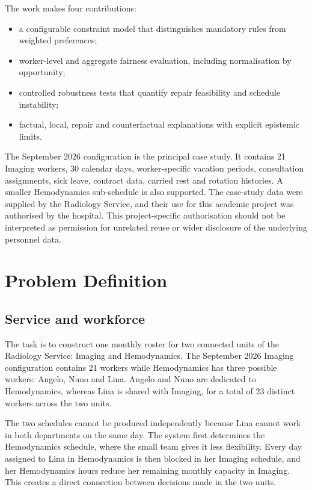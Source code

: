 \documentclass[11pt,a4paper]{article}
\begin{document}
The work makes four contributions:

\begin{itemize}
  \item a configurable constraint model that distinguishes mandatory rules from weighted preferences;
  \item worker-level and aggregate fairness evaluation, including normalisation by opportunity;
  \item controlled robustness tests that quantify repair feasibility and schedule instability;
  \item factual, local, repair and counterfactual explanations with explicit epistemic limits.
\end{itemize}

The September 2026 configuration is the principal case study. It contains 21 Imaging workers, 30 calendar days, worker-specific vacation periods, consultation assignments, sick leave, contract data, carried rest and rotation histories. A smaller Hemodynamics sub-schedule is also supported. The case-study data were supplied by the Radiology Service, and their use for this academic project was authorised by the hospital. This project-specific authorisation should not be interpreted as permission for unrelated reuse or wider disclosure of the underlying personnel data.

\section{Problem Definition}

\subsection{Service and workforce}

The task is to construct one monthly roster for two connected units of the Radiology Service: Imaging and Hemodynamics. The September 2026 Imaging configuration contains 21 workers while Hemodynamics has three possible workers: Angelo, Nuno and Lina. Angelo and Nuno are dedicated to Hemodynamics, whereas Lina is shared with Imaging, for a total of 23 distinct workers across the two units.

The two schedules cannot be produced independently because Lina cannot work in both departments on the same day. The system first determines the Hemodynamics schedule, where the small team gives it less flexibility. Every day assigned to Lina in Hemodynamics is then blocked in her Imaging schedule, and her Hemodynamics hours reduce her remaining monthly capacity in Imaging. This creates a direct connection between decisions made in the two units.
\end{document}
